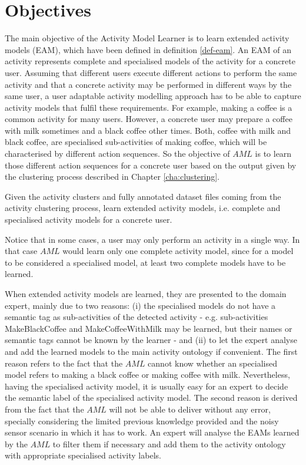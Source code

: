 \section{Objectives}
\label{sec:learner:objectives}

The main objective of the Activity Model Learner is to learn extended activity models (EAM), which have been defined in definition \ref{def-eam}. An EAM of an activity represents complete and specialised models of the activity for a concrete user. Assuming that different users execute different actions to perform the same activity and that a concrete activity may be performed in different ways by the same user, a user adaptable activity modelling approach has to be able to capture activity models that fulfil these requirements. For example, making a coffee is a common activity for many users. However, a concrete user may prepare a coffee with milk sometimes and a black coffee other times. Both, coffee with milk and black coffee, are specialised sub-activities of making coffee, which will be characterised by different action sequences. So the objective of $AML$ is to learn those different action sequences for a concrete user based on the output given by the clustering process described in Chapter \ref{cha:clustering}.

\begin{problem}[$AML$]
\label{pro-aml}
 Given the activity clusters and fully annotated dataset files coming from the activity clustering process, learn extended activity models, i.e. complete and specialised activity models for a concrete user.
\end{problem}

Notice that in some cases, a user may only perform an activity in a single way. In that case $AML$ would learn only one complete activity model, since for a model to be considered a specialised model, at least two complete models have to be learned. 

When extended activity models are learned, they are presented to the domain expert, mainly due to two reasons: (i) the specialised models do not have a semantic tag as sub-activities of the detected activity - e.g. sub-activities MakeBlackCoffee and MakeCoffeeWithMilk may be learned, but their names or semantic tags cannot be known by the learner - and (ii) to let the expert analyse and add the learned models to the main activity ontology if convenient. The first reason refers to the fact that the $AML$ cannot know whether an specialised model refers to making a black coffee or making coffee with milk. Nevertheless, having the specialised activity model, it is usually easy for an expert to decide the semantic label of the specialised activity model. The second reason is derived from the fact that the $AML$ will not be able to deliver without any error, specially considering the limited previous knowledge provided and the noisy sensor scenario in which it has to work. An expert will analyse the EAMs learned by the $AML$ to filter them if necessary and add them to the activity ontology with appropriate specialised activity labels.

